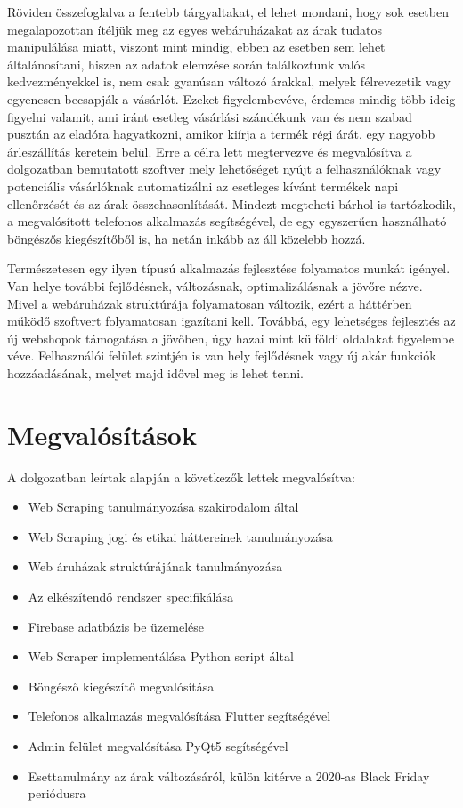 Röviden összefoglalva a fentebb tárgyaltakat, el lehet mondani, hogy sok esetben megalapozottan ítéljük meg az egyes webáruházakat az árak tudatos manipulálása miatt, viszont mint mindig, ebben az esetben sem lehet általánosítani, hiszen az adatok elemzése során találkoztunk valós kedvezményekkel is, nem csak gyanúsan változó árakkal, melyek félrevezetik vagy egyenesen becsapják a vásárlót. Ezeket figyelembevéve, érdemes mindig több ideig figyelni valamit, ami iránt esetleg vásárlási szándékunk van és nem szabad pusztán az eladóra hagyatkozni, amikor kiírja a termék régi árát, egy nagyobb árleszállítás keretein belül. Erre a célra lett megtervezve és megvalósítva a dolgozatban bemutatott szoftver mely lehetőséget nyújt a felhasználóknak vagy potenciális vásárlóknak automatizálni az esetleges kívánt termékek napi ellenőrzését és az árak összehasonlítását. Mindezt megteheti bárhol is tartózkodik, a megvalósított telefonos alkalmazás segítségével, de egy egyszerűen használható böngészős kiegészítőből is, ha netán inkább az áll közelebb hozzá.

Természetesen egy ilyen típusú alkalmazás fejlesztése folyamatos munkát igényel. Van helye további fejlődésnek, változásnak, optimalizálásnak a jövőre nézve. Mivel a webáruházak struktúrája folyamatosan változik, ezért a háttérben működő szoftvert folyamatosan igazítani kell. Továbbá, egy lehetséges fejlesztés az új webshopok támogatása a jövőben, úgy hazai mint külföldi oldalakat figyelembe véve. Felhasználói felület szintjén is van hely fejlődésnek vagy új akár funkciók hozzáadásának, melyet majd idővel meg is lehet tenni.

\section{Megvalósítások}

A dolgozatban leírtak alapján a következők lettek megvalósítva:
\begin{itemize}
    \item Web Scraping tanulmányozása szakirodalom által
    \item Web Scraping jogi és etikai háttereinek tanulmányozása
    \item Web áruházak struktúrájának tanulmányozása
    \item Az elkészítendő rendszer specifikálása
    \item Firebase adatbázis be üzemelése
    \item Web Scraper implementálása Python script által
    \item Böngésző kiegészítő megvalósítása
    \item Telefonos alkalmazás megvalósítása Flutter segítségével
    \item Admin felület megvalósítása PyQt5 segítségével
    \item Esettanulmány az árak változásáról, külön kitérve a 2020-as Black Friday periódusra
\end{itemize}